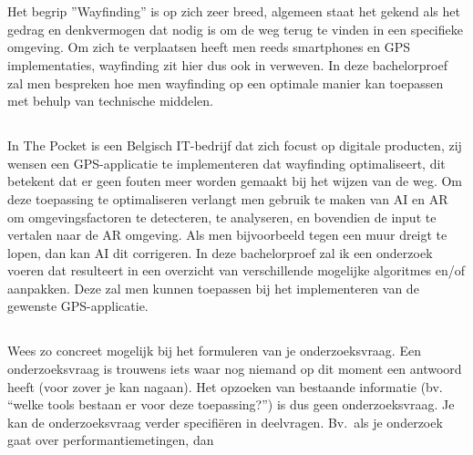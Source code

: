 \chapter{}
\label{ch:inleiding}

\section{}
\label{sec:wayfinding}
Het begrip ''Wayfinding'' is op zich zeer breed, algemeen staat het gekend als het gedrag en denkvermogen dat nodig is om de weg terug te vinden in een specifieke omgeving. Om zich te verplaatsen heeft men reeds smartphones en GPS implementaties, wayfinding zit hier dus ook in verweven. In deze bachelorproef zal men bespreken hoe men wayfinding op een optimale manier kan toepassen met behulp van technische middelen.

\section{}
\label{sec:probleemstelling}

In The Pocket is een Belgisch IT-bedrijf dat zich focust op digitale producten, zij wensen een GPS-applicatie te implementeren dat wayfinding optimaliseert, dit betekent dat er geen fouten meer worden gemaakt bij het wijzen van de weg. Om deze toepassing te optimaliseren verlangt men gebruik te maken van AI en AR om omgevingsfactoren te detecteren, te analyseren, en bovendien de input te vertalen naar de AR omgeving. Als men bijvoorbeeld tegen een muur dreigt te lopen, dan kan AI dit corrigeren. In deze bachelorproef zal ik een onderzoek voeren dat resulteert in een overzicht van verschillende mogelijke algoritmes en/of aanpakken. Deze zal men kunnen toepassen bij het implementeren van de gewenste GPS-applicatie.

\section{}
\label{sec:onderzoeksvraag}

Wees zo concreet mogelijk bij het formuleren van je onderzoeksvraag. Een onderzoeksvraag is trouwens iets waar nog niemand op dit moment een antwoord heeft (voor zover je kan nagaan). Het opzoeken van bestaande informatie (bv. ``welke tools bestaan er voor deze toepassing?'') is dus geen onderzoeksvraag. Je kan de onderzoeksvraag verder specifiëren in deelvragen. Bv.~als je onderzoek gaat over performantiemetingen, dan 

